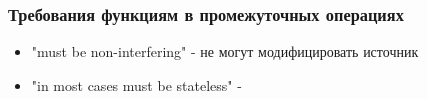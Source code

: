 \begin{frame}
\frametitle{Требования функциям в промежуточных операциях} %
\begin{itemize}
	\item "must be non-interfering" - не могут модифицировать источник
	\item "in most cases must be stateless" - 
\end{itemize}
\end{frame}